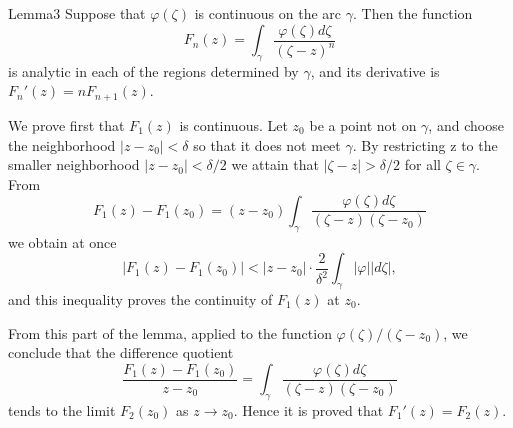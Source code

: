 \begin{originalstatement}{Lemma}{3}\label{lem:4.3}
Suppose that $\varphi (\zeta)$ is continuous on the arc $\gamma$. Then the function
\begin{equation*}
F _ {n} (z) = \int_ {\gamma} \frac {\varphi (\zeta) d \zeta}{(\zeta - z) ^ {n}}
\end{equation*}
is analytic in each of the regions determined by $\gamma$, and its derivative is $F_n'(z) = nF_{n+1}(z)$.

\end{originalstatement}
We prove first that $F_{1}(z)$ is continuous. Let $z_{0}$ be a point not on $\gamma$, and choose the neighborhood $|z - z_{0}| < \delta$ so that it does not meet $\gamma$. By restricting z to the smaller neighborhood $|z - z_{0}| < \delta/2$ we attain that $|\zeta - z| > \delta/2$ for all $\zeta \in \gamma$. From
\begin{equation*}
F _ {1} (z) - F _ {1} \left(z _ {0}\right) = (z - z _ {0}) \int_ {\gamma} \frac {\varphi (\zeta) d \zeta}{(\zeta - z) (\zeta - z _ {0})}
\end{equation*}
we obtain at once
\begin{equation*}
\left| F _ {1} (z) - F _ {1} \left(z _ {0}\right) \right| <   \left| z - z _ {0} \right| \cdot \frac {2}{\delta^ {2}} \int_ {\gamma} | \varphi | | d \zeta |,
\end{equation*}
and this inequality proves the continuity of $F_{1}(z)$ at $z_{0}$.

From this part of the lemma, applied to the function $\varphi(\zeta)/(\zeta - z_0)$, we conclude that the difference quotient
\begin{equation*}
\frac {F _ {1} (z) - F _ {1} \left(z _ {0}\right)}{z - z _ {0}} = \int_ {\gamma} \frac {\varphi (\zeta) d \zeta}{(\zeta - z) (\zeta - z _ {0})}
\end{equation*}
tends to the limit $F_{2}(z_{0})$ as $z \to z_{0}$. Hence it is proved that $F_{1}'(z) = F_{2}(z)$.

